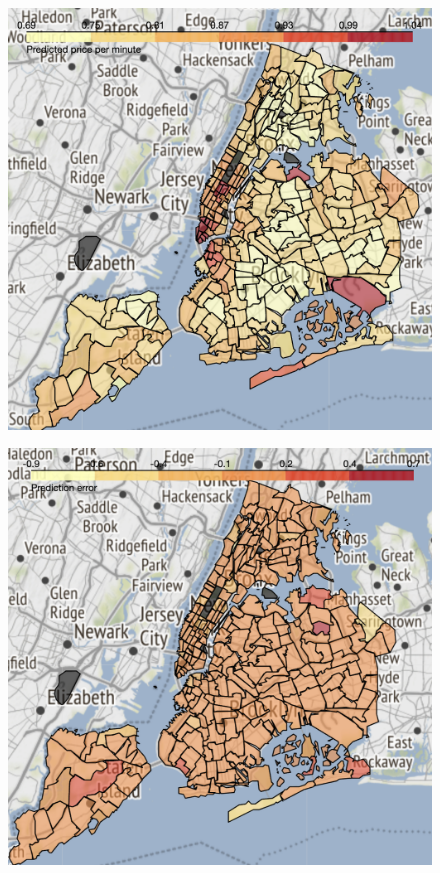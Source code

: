 \documentclass[11pt]{article}
\begin{document}
\begin{figure}[h]
\centering
    \begin{minipage}{.5\textwidth}
        \centering
        \includegraphics[width=.94\linewidth]{plots/RFpred_6am.png}
        \label{RFpred6}
    \end{minipage}%
    \begin{minipage}{.5\textwidth}
        \centering
        \includegraphics[width=.95\linewidth]{plots/RF_error.png}
        \label{RFerror6}
    \end{minipage}
\end{figure}
\end{document}
